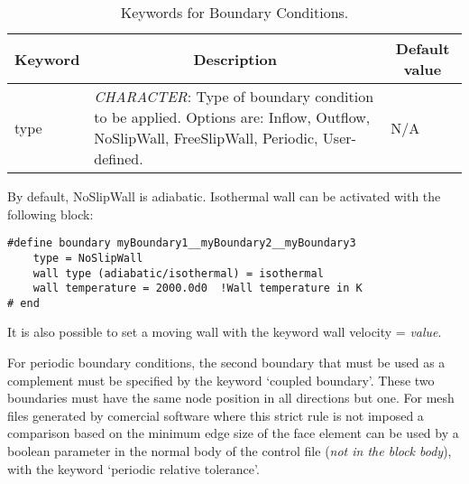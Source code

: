 \documentclass[a4paper,10pt]{report}
\begin{document}
\begin{table}[h]
\caption{Keywords for Boundary Conditions.}\label{tab:BC}

\begin{tabular}{|p{4cm}|p{10cm}|p{2.2cm}|}
\hline
\multicolumn{1}{|c|}{\textbf{Keyword}} & \multicolumn{1}{c|}{\textbf{Description}} & \multicolumn{1}{c|}{\textbf{Default value}} \\ \hline

type 	&
		\textit{CHARACTER}: Type of boundary condition to be applied. Options are: Inflow, Outflow, NoSlipWall, FreeSlipWall, Periodic, User-defined. &
							N/A \\ \hline

\end{tabular}
\end{table}

By default, NoSlipWall is adiabatic. Isothermal wall can be activated with the following block:

\begin{lstlisting}
#define boundary myBoundary1__myBoundary2__myBoundary3
	type = NoSlipWall
	wall type (adiabatic/isothermal) = isothermal
	wall temperature = 2000.0d0  !Wall temperature in K
# end
\end{lstlisting}

It is also possible to set a moving wall with the keyword wall velocity = \emph{value}. 

For periodic boundary conditions, the second boundary that must be used as a complement must be specified by the keyword `coupled boundary'. These two boundaries must have the same node position in all directions but one. For mesh files generated by comercial software where this strict rule is not imposed a comparison based on the minimum edge size of the face element can be used by a boolean parameter in the normal body of the control file (\emph{not in the block body}), with the keyword `periodic relative tolerance'.

\vspace{0.5 in}
\end{document}
